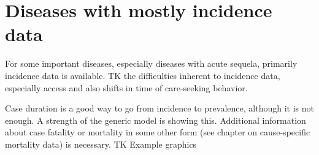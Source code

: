 \section{Diseases with mostly incidence data}

For some important diseases, especially diseases with acute sequela,
primarily incidence data is available. TK the difficulties inherent to
incidence data, especially access and also shifts in time of
care-seeking behavior.

Case duration is a good way to go from incidence to prevalence,
although it is not enough. A strength of the generic model is showing
this. Additional information about case fatality or mortality in some
other form (see chapter on cause-specific mortality data) is
necessary.  TK Example graphics
